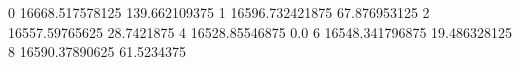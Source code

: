 0 16668.517578125 139.662109375
1 16596.732421875 67.876953125
2 16557.59765625 28.7421875
4 16528.85546875 0.0
6 16548.341796875 19.486328125
8 16590.37890625 61.5234375
